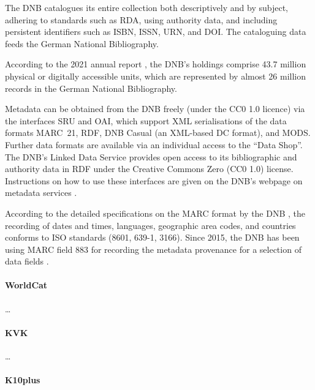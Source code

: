 The DNB catalogues its entire collection both descriptively and by subject, 
adhering to standards such as \gls{RDA}, using authority data, and including persistent identifiers such as ISBN, ISSN, URN, and DOI.
The cataloguing data feeds the German National Bibliography.

According to the 2021 annual report \autocite{DNB_Jahresbericht_2021},
the DNB's holdings comprise 43.7 million physical or digitally accessible units, 
which are represented by almost 26 million records in the German National Bibliography.

Metadata can be obtained from the DNB freely (under the CC0 1.0 licence) via the interfaces
\gls{SRU} and \gls{OAI}, which support XML serialisations of the data formats
MARC~21, \gls{RDF}, DNB Casual (an XML-based \gls{DC} format), and MODS.
Further data formats are available via an individual access
to the \enquote{Data Shop}.
The DNB's Linked Data Service provides open access to its bibliographic and authority data
in RDF under the Creative Commons Zero (CC0 1.0) license. Instructions on how to use these interfaces
are given on the DNB's webpage on metadata services \autocite{DNB_metadata}.

According to the detailed specifications on the MARC format by the DNB
\autocite{DNB_MARC21,DNB_MARCXML}, the recording of dates and times, languages,
geographic area codes, and countries conforms to ISO standards (8601, 639-1, 3166).
Since 2015, the DNB has been using MARC field 883
for recording the metadata provenance for a selection of data fields
\autocite{DNBwiki_MARC_883}.



\paragraph{WorldCat}

\dots

\paragraph{KVK}

\dots

\paragraph{K10plus}

